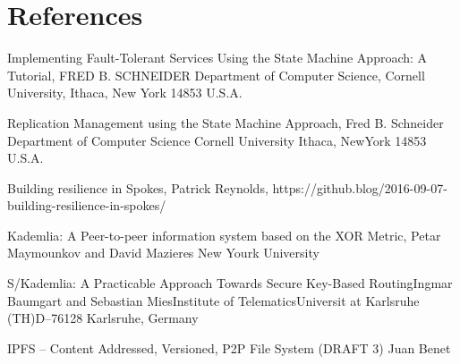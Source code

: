 \documentclass[acmlarge, screen, nonacm]{acmart}
\begin{document}
% 

\section{References}
\label{ref:references}

Implementing Fault-Tolerant Services Using the State Machine Approach: A Tutorial, FRED B. SCHNEIDER Department of Computer Science, Cornell University, Ithaca, New York 14853 U.S.A.

Replication Management using the State Machine Approach, Fred B. Schneider Department of Computer Science Cornell University Ithaca, NewYork 14853 U.S.A.

Building resilience in Spokes, Patrick Reynolds, https://github.blog/2016-09-07-building-resilience-in-spokes/

Kademlia: A Peer-to-peer information system based on the XOR Metric, Petar Maymounkov and David Mazieres New Yourk University

S/Kademlia: A Practicable Approach Towards Secure Key-Based RoutingIngmar Baumgart and Sebastian MiesInstitute of TelematicsUniversit at Karlsruhe (TH)\@ D–76128 Karlsruhe, Germany

IPFS -- Content Addressed, Versioned, P2P File System (DRAFT 3) Juan Benet

\end{document}
